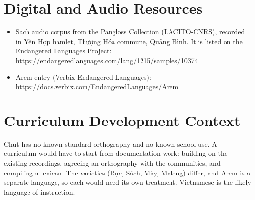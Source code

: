 \documentclass[12pt]{article}
\begin{document}
\section{Digital and Audio Resources}
\begin{itemize}
\item Sach audio corpus from the Pangloss Collection (LACITO-CNRS), recorded in Yên Hợp hamlet, Thượng Hóa commune, Quảng Bình. It is listed on the Endangered Languages Project: \url{https://endangeredlanguages.com/lang/1215/samples/10374}
\item Arem entry (Verbix Endangered Languages): \url{https://docs.verbix.com/EndangeredLanguages/Arem}
\end{itemize}

\section{Curriculum Development Context}
Chut has no known standard orthography and no known school use. A curriculum would have to start from documentation work: building on the existing recordings, agreeing an orthography with the communities, and compiling a lexicon. The varieties (Rục, Sách, Mày, Maleng) differ, and Arem is a separate language, so each would need its own treatment. Vietnamese is the likely language of instruction.
\end{document}
